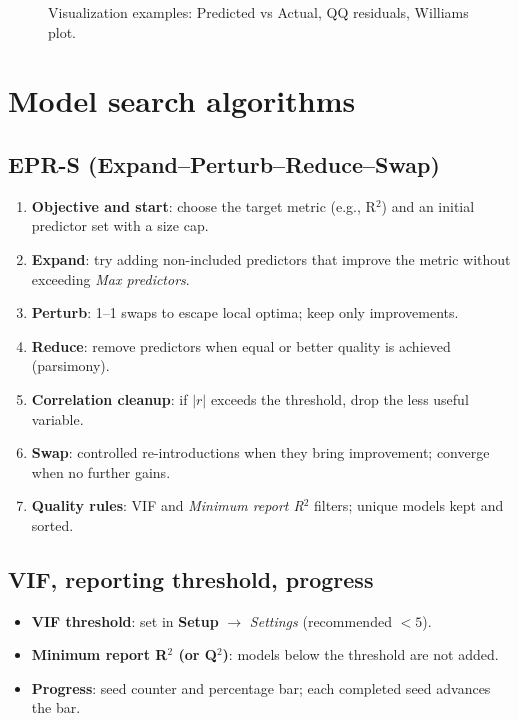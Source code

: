 \documentclass[12pt,a4paper]{article}
\begin{document}
\begin{figure}[H]
  \centering
  \fbox{\rule[0pt]{0pt}{140pt}\hspace{0.9\linewidth}}
  \caption{Visualization examples: Predicted vs Actual, QQ residuals, Williams plot.}
  \label{fig:viz}
\end{figure}

\section{Model search algorithms}
\subsection{EPR-S (Expand–Perturb–Reduce–Swap)}
\begin{enumerate}
  \item \textbf{Objective and start}: choose the target metric (e.g., R$^2$) and an initial predictor set with a size cap.
  \item \textbf{Expand}: try adding non-included predictors that improve the metric without exceeding \emph{Max predictors}.
  \item \textbf{Perturb}: 1--1 swaps to escape local optima; keep only improvements.
  \item \textbf{Reduce}: remove predictors when equal or better quality is achieved (parsimony).
  \item \textbf{Correlation cleanup}: if $|r|$ exceeds the threshold, drop the less useful variable.
  \item \textbf{Swap}: controlled re-introductions when they bring improvement; converge when no further gains.
  \item \textbf{Quality rules}: VIF and \emph{Minimum report R$^2$} filters; unique models kept and sorted.
\end{enumerate}

\subsection{VIF, reporting threshold, progress}
\begin{itemize}
  \item \textbf{VIF threshold}: set in \textbf{Setup} $\rightarrow$ \emph{Settings} (recommended $<5$).
  \item \textbf{Minimum report R$^2$ (or Q$^2$)}: models below the threshold are not added.
  \item \textbf{Progress}: seed counter and percentage bar; each completed seed advances the bar.
\end{itemize}
\end{document}
